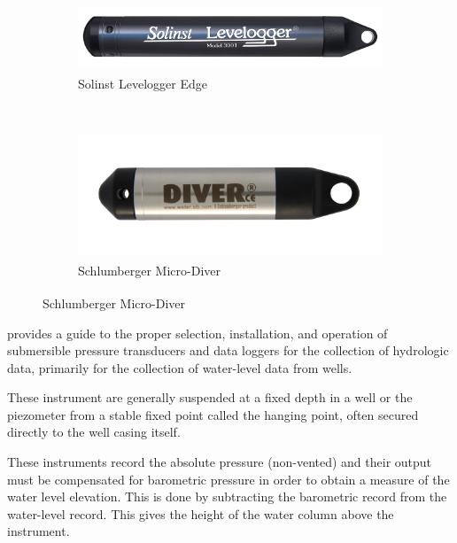 \documentclass[12pt, letterpaper, fleqn]{report}
\begin{document}
\begin{figure}[!ht]
        \centering
        \begin{subfigure}[t]{0.5\textwidth}
                \includegraphics[width=\textwidth]{img/Solinst_EdgeLeveLogger}
                \caption{Solinst Levelogger Edge\textsuperscript{\textregistered}}
                \label{subfig:levelogger_solinst}                
        \end{subfigure}%
        \\[0.5cm]
        \begin{subfigure}[t]{0.5\textwidth}
                \includegraphics[width=\textwidth]{img/Schlumberger_MiniDiver}
                \caption{Schlumberger Micro-Diver\textsuperscript{\textregistered}}
                \label{subfig:levelogger_schlumberger}
        \end{subfigure}
       
\end{figure}

\cite{freeman_use_2004} provides a guide to the proper selection, installation, and operation of submersible pressure transducers and data loggers for the collection of hydrologic data, primarily for the collection of water-level data from wells.

These instrument are generally suspended at a fixed depth in a well or the piezometer from a stable fixed point called the hanging point, often secured directly to the well casing itself.

These instruments record the absolute pressure (non-vented) and their output must be compensated for barometric pressure in order to obtain a measure of the water level elevation. This is done by subtracting the barometric record from the water-level record. This gives the height of the water column above the instrument.  
\end{document}
